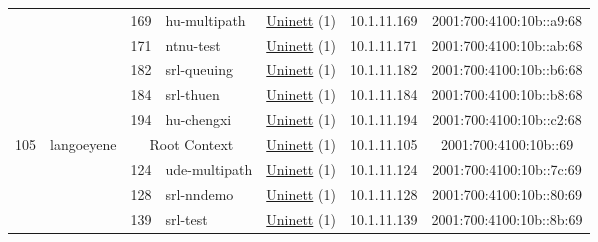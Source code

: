 \begin{small}
\begin{center}
\begin{longtable}{|c|c|c|c|c|c|c|c|}
  &  & \tiny{169} & \multicolumn{1}{|l|}{\tiny{hu-multipath}} & \multicolumn{2}{|c|}{\tiny{\href{https://www.uninett.no}{Uninett} (1)}} & \tiny{10.1.11.169} & \tiny{2001:700:4100:10b::a9:68} \\* \cline{3-3}\cline{4-4}\cline{5-5}\cline{6-6}\cline{7-7}\cline{8-8}
  &  & \tiny{171} & \multicolumn{1}{|l|}{\tiny{ntnu-test}} & \multicolumn{2}{|c|}{\tiny{\href{https://www.uninett.no}{Uninett} (1)}} & \tiny{10.1.11.171} & \tiny{2001:700:4100:10b::ab:68} \\* \cline{3-3}\cline{4-4}\cline{5-5}\cline{6-6}\cline{7-7}\cline{8-8}
  &  & \tiny{182} & \multicolumn{1}{|l|}{\tiny{srl-queuing}} & \multicolumn{2}{|c|}{\tiny{\href{https://www.uninett.no}{Uninett} (1)}} & \tiny{10.1.11.182} & \tiny{2001:700:4100:10b::b6:68} \\* \cline{3-3}\cline{4-4}\cline{5-5}\cline{6-6}\cline{7-7}\cline{8-8}
  &  & \tiny{184} & \multicolumn{1}{|l|}{\tiny{srl-thuen}} & \multicolumn{2}{|c|}{\tiny{\href{https://www.uninett.no}{Uninett} (1)}} & \tiny{10.1.11.184} & \tiny{2001:700:4100:10b::b8:68} \\* \cline{3-3}\cline{4-4}\cline{5-5}\cline{6-6}\cline{7-7}\cline{8-8}
  &  & \tiny{194} & \multicolumn{1}{|l|}{\tiny{hu-chengxi}} & \multicolumn{2}{|c|}{\tiny{\href{https://www.uninett.no}{Uninett} (1)}} & \tiny{10.1.11.194} & \tiny{2001:700:4100:10b::c2:68} \\ \hline
 \multirow{12}{*}{\tiny{105}} & \multicolumn{1}{|l|}{\multirow{12}{*}{\tiny{langoeyene}}} & \multicolumn{2}{|c|}{\tiny{Root Context}} & \multicolumn{2}{|c|}{\tiny{\href{https://www.uninett.no}{Uninett} (1)}} & \tiny{10.1.11.105} & \tiny{2001:700:4100:10b::69} \\* \cline{3-3}\cline{4-4}\cline{5-5}\cline{6-6}\cline{7-7}\cline{8-8}
  &  & \tiny{124} & \multicolumn{1}{|l|}{\tiny{ude-multipath}} & \multicolumn{2}{|c|}{\tiny{\href{https://www.uninett.no}{Uninett} (1)}} & \tiny{10.1.11.124} & \tiny{2001:700:4100:10b::7c:69} \\* \cline{3-3}\cline{4-4}\cline{5-5}\cline{6-6}\cline{7-7}\cline{8-8}
  &  & \tiny{128} & \multicolumn{1}{|l|}{\tiny{srl-nndemo}} & \multicolumn{2}{|c|}{\tiny{\href{https://www.uninett.no}{Uninett} (1)}} & \tiny{10.1.11.128} & \tiny{2001:700:4100:10b::80:69} \\* \cline{3-3}\cline{4-4}\cline{5-5}\cline{6-6}\cline{7-7}\cline{8-8}
  &  & \tiny{139} & \multicolumn{1}{|l|}{\tiny{srl-test}} & \multicolumn{2}{|c|}{\tiny{\href{https://www.uninett.no}{Uninett} (1)}} & \tiny{10.1.11.139} & \tiny{2001:700:4100:10b::8b:69} \\* \cline{3-3}\cline{4-4}\cline{5-5}\cline{6-6}\cline{7-7}\cline{8-8}

\end{longtable}
\end{center}
\end{small}

